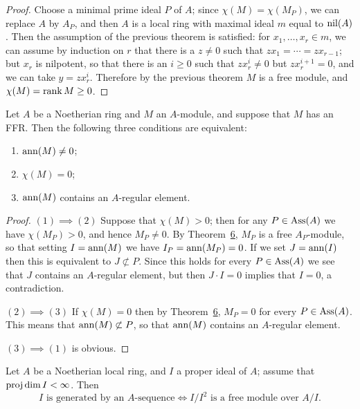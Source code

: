 \begin{proof}
Choose a minimal prime ideal $P$ of $A$; since $\chi(M) = \chi(M_P)$, we can
replace $A$ by $A_P$, and then $A$ is a local ring with maximal ideal $m$ equal to
$\operatorname{nil}(A)$. Then the assumption of the previous theorem is satisfied: for
$x_1, \ldots, x_r \in m$, we can assume by induction on $r$ that there is a $z \neq 0$
such that $zx_1 = \cdots = zx_{r-1}$; but $x_r$ is nilpotent, so that there is an $i \ge 0$
such that $zx_r^i \neq 0$ but $zx_r^{i+1} = 0$, and we can take $y = zx_r^i$. Therefore by
the previous theorem $M$ is a free module, and $\chi(M) = \operatorname{rank} M \ge 0$.
\end{proof}

\begin{theorem}\label{thm:19.8}
Let $A$ be a Noetherian
ring and $M$ an $A$-module, and suppose that $M$ has an FFR. Then the
following three conditions are equivalent:
\begin{enumerate}[(1)]
  \item $\operatorname{ann}(M) \neq 0$;
  \item $\chi(M) = 0$;
  \item $\operatorname{ann}(M)$ contains an $A$-regular element.
\end{enumerate}
\end{theorem}

\begin{proof}
$(1) \implies (2)$ Suppose that $\chi(M) > 0$; then for any $P \in \operatorname{Ass}(A)$ we have
$\chi(M_P) > 0$, and hence $M_P \neq 0$. By Theorem~\hyperref[thm:19.6]{6}, $M_P$ is a free $A_P$-module, so
that setting $I = \operatorname{ann}(M)$ we have $I_P = \operatorname{ann}(M_P) = 0$. If we set $J = \operatorname{ann}(I)$
then this is equivalent to $J \not\subset P$. Since this holds for every $P \in \operatorname{Ass}(A)$
we see that $J$ contains an $A$-regular element, but then $J \cdot I = 0$ implies that
$I = 0$, a contradiction.

$(2) \implies (3)$ If $\chi(M) = 0$ then by Theorem~\hyperref[thm:19.6]{6}, $M_P = 0$ for every $P \in \operatorname{Ass}(A)$.
This means that $\operatorname{ann}(M) \not\subset P$, so that $\operatorname{ann}(M)$ contains an $A$-regular
element.

$(3) \implies (1)$ is obvious.
\end{proof}

\begin{theorem}\label{thm:19.9}
Let $A$ be a Noetherian local ring, and
$I$ a proper ideal of $A$; assume that $\operatorname{proj\,dim} I < \infty$. Then
\[
  I \text{ is generated by an $A$-sequence} \iff I/I^2 \text{ is a free module over } A/I.
\]
\end{theorem}

